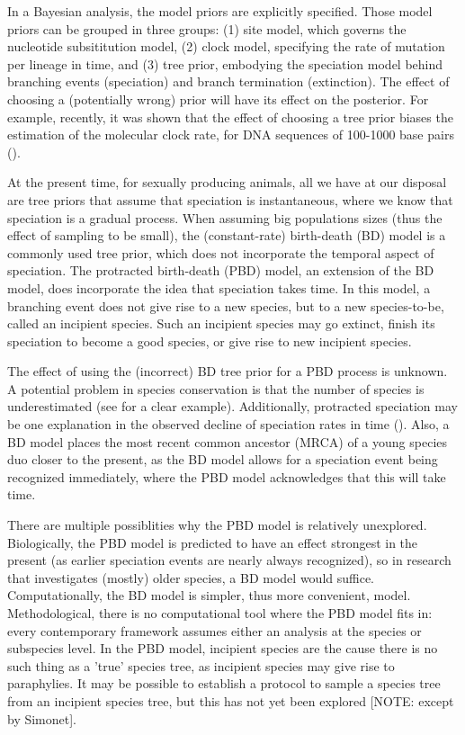 \documentclass{article}
\begin{document}
In a Bayesian analysis, the model priors are explicitly specified.
Those model priors can be grouped in three groups: (1) site model, which
governs the nucleotide subsititution model, (2) clock model, specifying
the rate of mutation per lineage in time, and (3) tree prior, embodying
the speciation model behind branching events (speciation) 
and branch termination (extinction).
The effect of choosing a (potentially wrong) prior will have its effect on
the posterior. For example, recently, it was shown that the effect
of choosing a tree prior biases the estimation of the molecular clock rate, 
for DNA sequences of 100-1000 base pairs (\cite{moller2018}).

At the present time, for sexually producing animals, all we have at our
disposal are tree priors that assume that speciation
is instantaneous, where we know that speciation is a gradual process.
When assuming big populations sizes (thus the effect of sampling to 
be small), the (constant-rate) birth-death (BD) model is a commonly 
used tree prior, which does not incorporate the temporal aspect of speciation.
The protracted birth-death (PBD) model, an extension of 
the BD model, does incorporate the idea that speciation takes time.
In this model, a branching event does not give rise to a new species, but to
a new species-to-be, called an incipient species. Such an incipient
species may go extinct, finish its speciation to become a good species, or give
rise to new incipient species.

The effect of using the (incorrect) BD tree prior for a PBD process is unknown.
A potential problem in species conservation is that the number of 
species is underestimated (see \cite{fennessy2016} for a clear example). 
Additionally, protracted speciation may be one 
explanation in the observed decline of speciation rates in 
time (\cite{etienne2012}). Also, a BD model places the most recent common 
ancestor (MRCA) of a young species duo closer to the present, as the
BD model allows for a speciation event being recognized immediately,
where the PBD model acknowledges that this will take time.

There are multiple possiblities why the PBD model is relatively unexplored.
Biologically, the PBD model is predicted to have an effect strongest in
the present (as earlier speciation events are nearly always recognized),
so in research that investigates (mostly) older species, a BD model would suffice. 
Computationally, the BD model is simpler, thus more convenient, model. 
Methodological, there is no computational tool where 
the PBD model fits in: every contemporary framework assumes 
either an analysis at the species or subspecies level. In the PBD
model, incipient species are the cause there is no such thing 
as a 'true' species tree, as incipient species may give rise to paraphylies.
It may be possible to establish a protocol to sample a species tree from an 
incipient species tree, but this has not yet been explored [NOTE: except by Simonet].
\end{document}
